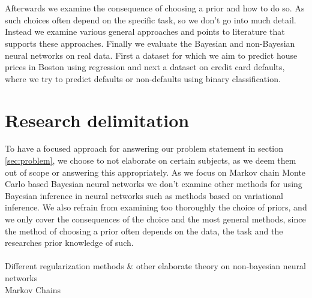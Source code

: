 \\
\\
Afterwards we examine the consequence of choosing a prior and how to do so. As such choices often depend on the specific task, so we don't go into much detail. Instead we examine various general approaches and points to literature that supports these approaches. Finally we evaluate the Bayesian and non-Bayesian neural networks on real data. First a dataset for which we aim to predict house prices in Boston using regression and next a dataset on credit card defaults, where we try to predict defaults or non-defaults using binary classification. 


\section{Research delimitation}
To have a focused approach for answering our problem statement in section \ref{sec:problem}, we choose to not elaborate on certain subjects, as we deem them out of scope or answering this appropriately. As we focus on Markov chain Monte Carlo based Bayesian neural networks we don't examine other methods for using Bayesian inference in neural networks such as methods based on variational inference. We also refrain from examining too thoroughly the choice of priors, and we only cover the consequences of the choice and the most general methods, since the method of choosing a prior often depends on the data, the task and the researches prior knowledge of such. 
\\
\\
Different regularization methods \& other elaborate theory on non-bayesian neural networks \\
Markov Chains \\







